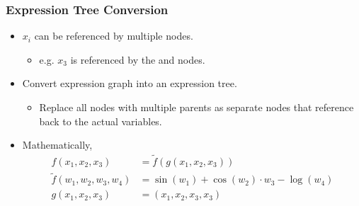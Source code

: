 \begin{frame}
\frametitle{Expression Tree Conversion}
\begin{itemize}
\item $x_i$ can be referenced by multiple nodes.
    \begin{itemize}
        \item e.g. $x_3$ is referenced by the \code{*} and  nodes.
    \end{itemize}

\item Convert expression graph into an expression tree.
    \begin{itemize}
        \item Replace all nodes with multiple parents as separate nodes
            that reference back to the actual variables.
    \end{itemize}

\item Mathematically,
\begin{align}
    f(x_1, x_2, x_3) &= \tilde{f}(g(x_1, x_2, x_3)) \label{eq:f-tree-example} \\
    \tilde{f}(w_1, w_2, w_3, w_4) &= \sin(w_1) + \cos(w_2) \cdot w_3 - \log(w_4) \nonumber \\
    g(x_1, x_2, x_3) &= (x_1, x_2, x_3, x_3) \nonumber
\end{align}

\end{itemize}
\end{frame}

